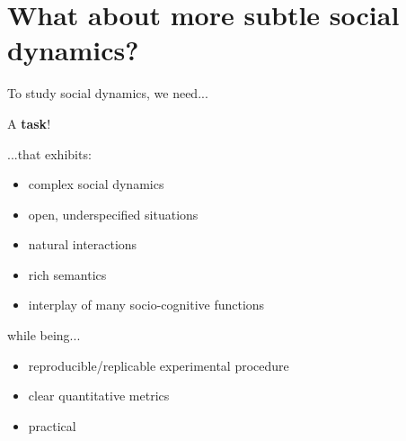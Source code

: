 \documentclass[compress]{beamer}
\begin{document}
%
%
%
%
%



\section[PInSoRo]{What about more subtle social dynamics?}

\begin{frame}{To study social dynamics, we need...}

    \pause

    \begin{center}
        A {\bf task}!
    \end{center}
    
    \pause
    ...that exhibits:

    \begin{itemize}
        \item complex social dynamics
        \item open, underspecified situations
        \item natural interactions
        \item rich semantics
        \item interplay of many socio-cognitive functions
    \end{itemize}

    \pause

    while being...
    \begin{itemize}
        \item reproducible/replicable experimental procedure
        \item clear quantitative metrics
        \item practical
    \end{itemize}
\end{frame}
\end{document}
